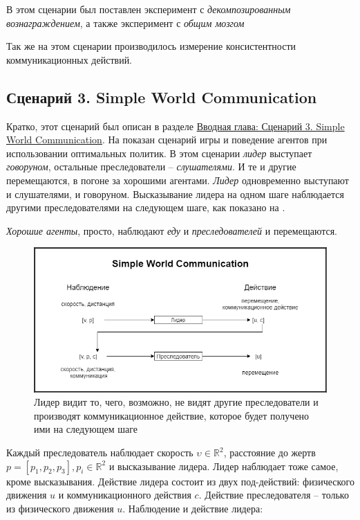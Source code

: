 В этом сценарии был поставлен эксперимент с \textit{декомпозированным вознаграждением}, а также эксперимент с \textit{общим мозгом}

Так же на этом сценарии производилось измерение консистентности коммуникационных действий.

\subsection{Сценарий 3. Simple World Communication} \label{exp-swc}

Кратко, этот сценарий был описан в разделе \hyperref[intro-swc]{Вводная глава: Сценарий 3. Simple World Communication}. На  показан сценарий игры и поведение агентов при использовании оптимальных политик. В этом сценарии \textit{лидер} выступает \textit{говоруном}, остальные преследователи – \textit{слушателями}. И те и другие перемещаются, в погоне за хорошими агентами. \textit{Лидер} одновременно выступают и слушателями, и говоруном. Высказывание лидера на одном шаге наблюдается другими преследователями на следующем шаге, как показано на .

\textit{Хорошие агенты}, просто, наблюдают \textit{еду} и \textit{преследователей} и перемещаются.

\begin{figure}[ht!]
    \center
    \includegraphics [scale=0.60] {my_folder/images/ch4/simple_world_communication.png}
    \caption{Лидер видит то, чего, возможно, не видят другие преследователи и производят коммуникационное действие, которое будет получено ими на следующем шаге}
    \label{fig:exp-swc}
\end{figure}

Каждый преследователь наблюдает скорость $\upsilon \in \mathbb{R}^2$, расстояние до жертв $p = [p_1, p_2, p_3], p_i \in \mathbb{R}^2$ и высказывание лидера. Лидер наблюдает тоже самое, кроме высказывания. Действие лидера состоит из двух под-действий: физического движения $u$ и коммуникационного действия $c$. Действие преследователя – только из физического движения $u$.
Наблюдение и действие лидера:

